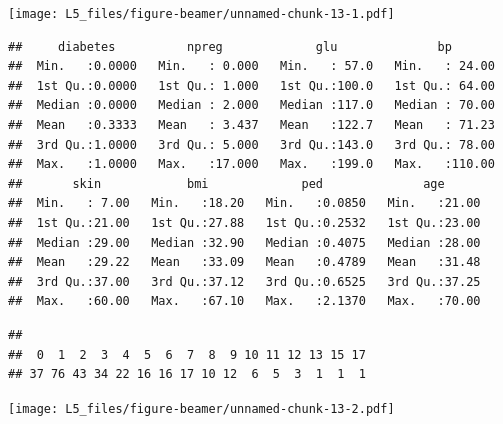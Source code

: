 \documentclass[
  ignorenonframetext,
]{beamer}
\begin{document}
\begin{frame}[fragile]

\texttt{[image: L5\_files/figure-beamer/unnamed-chunk-13-1.pdf]}

\begin{verbatim}
##     diabetes          npreg             glu              bp        
##  Min.   :0.0000   Min.   : 0.000   Min.   : 57.0   Min.   : 24.00  
##  1st Qu.:0.0000   1st Qu.: 1.000   1st Qu.:100.0   1st Qu.: 64.00  
##  Median :0.0000   Median : 2.000   Median :117.0   Median : 70.00  
##  Mean   :0.3333   Mean   : 3.437   Mean   :122.7   Mean   : 71.23  
##  3rd Qu.:1.0000   3rd Qu.: 5.000   3rd Qu.:143.0   3rd Qu.: 78.00  
##  Max.   :1.0000   Max.   :17.000   Max.   :199.0   Max.   :110.00  
##       skin            bmi             ped              age       
##  Min.   : 7.00   Min.   :18.20   Min.   :0.0850   Min.   :21.00  
##  1st Qu.:21.00   1st Qu.:27.88   1st Qu.:0.2532   1st Qu.:23.00  
##  Median :29.00   Median :32.90   Median :0.4075   Median :28.00  
##  Mean   :29.22   Mean   :33.09   Mean   :0.4789   Mean   :31.48  
##  3rd Qu.:37.00   3rd Qu.:37.12   3rd Qu.:0.6525   3rd Qu.:37.25  
##  Max.   :60.00   Max.   :67.10   Max.   :2.1370   Max.   :70.00
\end{verbatim}

\begin{verbatim}
## 
##  0  1  2  3  4  5  6  7  8  9 10 11 12 13 15 17 
## 37 76 43 34 22 16 16 17 10 12  6  5  3  1  1  1
\end{verbatim}

\texttt{[image: L5\_files/figure-beamer/unnamed-chunk-13-2.pdf]}

\end{frame}
\end{document}
